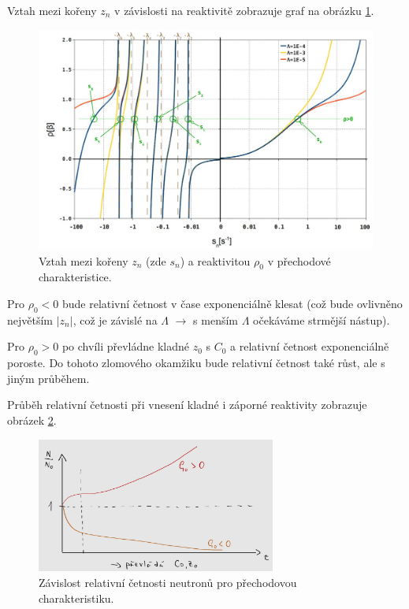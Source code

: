 Vztah mezi kořeny $z_n$ v závislosti na reaktivitě zobrazuje graf na obrázku \ref{fig_zn-rho}.

\begin{figure}[H]
  \centering
  \includegraphics[width=1\textwidth]{img/zn-rho.jpg}
  \caption{Vztah mezi kořeny $z_n$ (zde $s_n$) a reaktivitou $\rho_0$ v přechodové charakteristice.}
  \label{fig_zn-rho}
\end{figure}

Pro $\rho_0 < 0$ bude relativní četnost v čase exponenciálně klesat (což bude ovlivněno největším $|z_n|$, což je závislé na $\Lambda$ $\rightarrow$ s menším $\Lambda$ očekáváme strmější nástup).

Pro $\rho_0 > 0$ po chvíli převládne kladné $z_0$ s $C_0$ a relativní četnost exponenciálně poroste. Do tohoto zlomového okamžiku bude relativní četnost také růst, ale s jiným průběhem.

Průběh relativní četnosti při vnesení kladné i záporné reaktivity zobrazuje obrázek \ref{fig_prechodova}.

\begin{figure}[H]
  \centering
  \includegraphics[width=0.7\textwidth]{img/prechodova.jpg}
  \caption{Závislost relativní četnosti neutronů pro přechodovou charakteristiku.}
  \label{fig_prechodova}
\end{figure}




